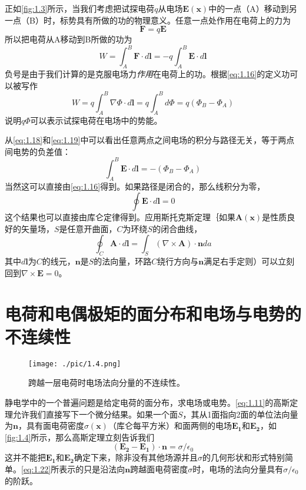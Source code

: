 \documentclass[12pt]{book}
\numberwithin{equation}{chapter}
\numberwithin{figure}{chapter}
\numberwithin{footnote}{page}
\begin{document}
正如\autoref{fig:1.3}所示，当我们考虑把试探电荷$q$从电场$\mathbf{E}(\mathbf{x})$中的一点（A）移动到另一点（B）时，标势具有所做的功的物理意义。任意一点处作用在电荷上的力为
$$\mathbf{F}=q\mathbf{E}$$
所以把电荷从A移动到B所做的功为
\begin{equation}\label{eq:1.18}
    W=\int_A^B\mathbf{F}\cdot d\mathbf{l}=-q\int_A^B\mathbf{E}\cdot d\mathbf{l}
\end{equation}
负号是由于我们计算的是克服电场力\textit{作用}在电荷上的功。根据\autoref{eq:1.16}的定义功可以被写作
\begin{equation}\label{eq:1.19}
    W=q\int_A^B\nabla\Phi\cdot d\mathbf{l}=q\int_A^B d\Phi=q(\Phi_B-\Phi_A)
\end{equation}
说明$q\Phi$可以表示试探电荷在电场中的势能。

从\autoref{eq:1.18}和\autoref{eq:1.19}中可以看出任意两点之间电场的积分与路径无关，等于两点间电势的负差值：
\begin{equation}\label{eq:1.20}
    \int_A^B \mathbf{E}\cdot d\mathbf{l}=-(\Phi_B-\Phi_A)
\end{equation}
当然这可以直接由\autoref{eq:1.16}得到。如果路径是闭合的，那么线积分为零，
\begin{equation}\label{eq:1.21}
    \oint \mathbf{E}\cdot d\mathbf{l}=0
\end{equation}
这个结果也可以直接由库仑定律得到。应用斯托克斯定理｛如果$\mathbf{A}(\mathbf{x})$是性质良好的矢量场，$S$是任意开曲面，$C$为环绕$S$的闭合曲线，
$$\oint_C \mathbf{A}\cdot d\mathbf{l}=\int_S (\nabla \times \mathbf{A})\cdot\mathbf{n}da$$
其中$d\mathbf{l}$为$C$的线元，$\mathbf{n}$是$S$的法向量，环路$C$绕行方向与$\mathbf{n}$满足右手定则）可以立刻回到$\nabla\times\mathbf{E}=0$。

\section{电荷和电偶极矩的面分布和电场与电势的不连续性}\label{sec:1.6}

\begin{figure}[!ht]
    \centering
    \texttt{[image: ./pic/1.4.png]}
    \captionsetup{justification=raggedright, singlelinecheck=false}
    \caption{跨越一层电荷时电场法向分量的不连续性。}
    \label{fig:1.4}
\end{figure}

静电学中的一个普遍问题是给定电荷的面分布，求电场或电势。\autoref{eq:1.11}的高斯定理允许我们直接写下一个微分结果。如果一个面$S$，其从1面指向2面的单位法向量为$\mathbf{n}$，具有面电荷密度$\sigma(\mathbf{x})$（库仑每平方米）和面两侧的电场$\mathbf{E_1}$和$\mathbf{E_2}$，如\autoref{fig:1.4}所示，那么高斯定理立刻告诉我们
\begin{equation}\label{eq:1.22}
    (\mathbf{E_2}-\mathbf{E_1})\cdot\mathbf{n}=\sigma/\epsilon_0
\end{equation}
这并不能把$\mathbf{E_1}$和$\mathbf{E_2}$确定下来，除非没有其他场源并且$\sigma$的几何形状和形式特别简单。\autoref{eq:1.22}所表示的只是沿法向$\mathbf{n}$跨越面电荷密度$\sigma$时，电场的法向分量具有$\sigma/\epsilon_0$的阶跃。
\end{document}
